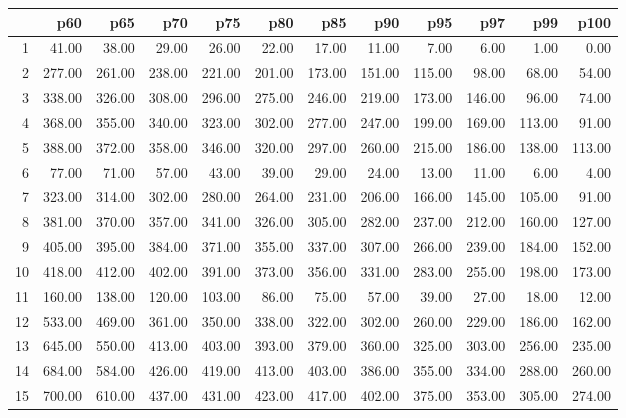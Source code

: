 \begin{table}[ht]
\centering
\begin{tabular}{rrrrrrrrrrrr}
  \hline
 & p60 & p65 & p70 & p75 & p80 & p85 & p90 & p95 & p97 & p99 & p100 \\ 
  \hline
1 & 41.00 & 38.00 & 29.00 & 26.00 & 22.00 & 17.00 & 11.00 & 7.00 & 6.00 & 1.00 & 0.00 \\ 
  2 & 277.00 & 261.00 & 238.00 & 221.00 & 201.00 & 173.00 & 151.00 & 115.00 & 98.00 & 68.00 & 54.00 \\ 
  3 & 338.00 & 326.00 & 308.00 & 296.00 & 275.00 & 246.00 & 219.00 & 173.00 & 146.00 & 96.00 & 74.00 \\ 
  4 & 368.00 & 355.00 & 340.00 & 323.00 & 302.00 & 277.00 & 247.00 & 199.00 & 169.00 & 113.00 & 91.00 \\ 
  5 & 388.00 & 372.00 & 358.00 & 346.00 & 320.00 & 297.00 & 260.00 & 215.00 & 186.00 & 138.00 & 113.00 \\ 
  6 & 77.00 & 71.00 & 57.00 & 43.00 & 39.00 & 29.00 & 24.00 & 13.00 & 11.00 & 6.00 & 4.00 \\ 
  7 & 323.00 & 314.00 & 302.00 & 280.00 & 264.00 & 231.00 & 206.00 & 166.00 & 145.00 & 105.00 & 91.00 \\ 
  8 & 381.00 & 370.00 & 357.00 & 341.00 & 326.00 & 305.00 & 282.00 & 237.00 & 212.00 & 160.00 & 127.00 \\ 
  9 & 405.00 & 395.00 & 384.00 & 371.00 & 355.00 & 337.00 & 307.00 & 266.00 & 239.00 & 184.00 & 152.00 \\ 
  10 & 418.00 & 412.00 & 402.00 & 391.00 & 373.00 & 356.00 & 331.00 & 283.00 & 255.00 & 198.00 & 173.00 \\ 
  11 & 160.00 & 138.00 & 120.00 & 103.00 & 86.00 & 75.00 & 57.00 & 39.00 & 27.00 & 18.00 & 12.00 \\ 
  12 & 533.00 & 469.00 & 361.00 & 350.00 & 338.00 & 322.00 & 302.00 & 260.00 & 229.00 & 186.00 & 162.00 \\ 
  13 & 645.00 & 550.00 & 413.00 & 403.00 & 393.00 & 379.00 & 360.00 & 325.00 & 303.00 & 256.00 & 235.00 \\ 
  14 & 684.00 & 584.00 & 426.00 & 419.00 & 413.00 & 403.00 & 386.00 & 355.00 & 334.00 & 288.00 & 260.00 \\ 
  15 & 700.00 & 610.00 & 437.00 & 431.00 & 423.00 & 417.00 & 402.00 & 375.00 & 353.00 & 305.00 & 274.00 \\ 
   \hline
\end{tabular}
\end{table}

